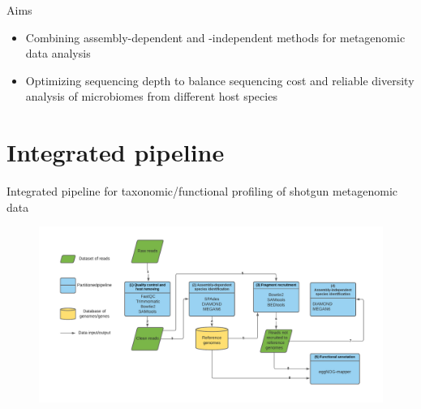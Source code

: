 \documentclass{beamer}
\begin{document}
\begin{frame}{Aims}
    \begin{itemize}
        \item Combining assembly-dependent and -independent methods for metagenomic data analysis
        \item Optimizing sequencing depth to balance sequencing cost and reliable diversity analysis of microbiomes from different host species
    \end{itemize}
\end{frame}


\section{Integrated pipeline}
\begin{frame}{Integrated pipeline for taxonomic/functional profiling of shotgun metagenomic data}
    \begin{figure}
        \includegraphics[width=1.1\textwidth]{../Figures/FigurePipeline.pdf}
    \end{figure}
\end{frame}
\end{document}
